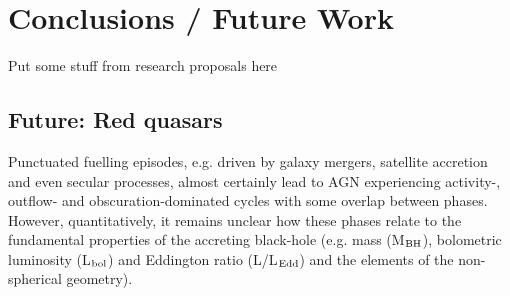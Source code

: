 
\chapter{Conclusions / Future Work}\label{ch:conclusions} 


Put some stuff from research proposals here 

\section{Future: Red quasars}

Punctuated fuelling episodes, e.g. driven by galaxy mergers, satellite accretion and even secular processes,
almost certainly lead to AGN experiencing activity-, outflow- and obscuration-dominated cycles with some overlap between phases. 
However, quantitatively, it remains unclear how these phases relate to the fundamental properties of the accreting black-hole (e.g.  mass (M$_{\rm{BH}}$), bolometric luminosity (L$_{\rm{bol}}$) and Eddington ratio (L/L$_{\rm{Edd}}$) and the elements of the non-spherical geometry).